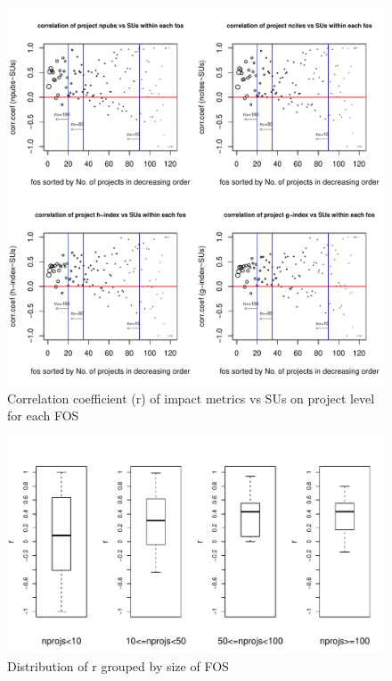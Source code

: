 \documentclass{sig-alternate}
\begin{document}
\begin{figure}[!htb] 
  \centering 
    \includegraphics[width=1.0\columnwidth]{images/06_corr_metrics_vs_alloc_proj_by_fos.pdf} 
  \caption{Correlation coefficient (r) of impact metrics vs SUs on project level for each FOS}\label{F:corr-metrics-vs-alloc-proj-by-fos} 
\end{figure} 

\begin{figure}[!htb] 
  \centering 
    \includegraphics[width=1.0\columnwidth]{images/06_corr_ncites_boxplot_4groups.pdf} 
  \caption{Distribution of r grouped by size of FOS}\label{F:corr-ncites-box} 
\end{figure} 
 
\end{document}
